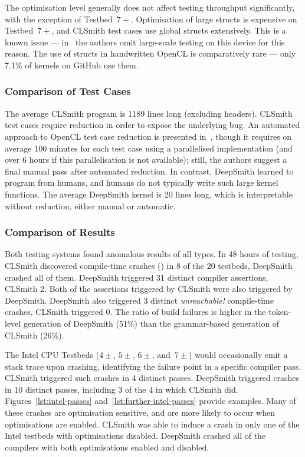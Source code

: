 The optimisation level generally does not affect testing throughput significantly, with the exception of Testbed~$7+$. Optimisation of large structs is expensive on Testbed~$7+$, and CLSmith test cases use global structs extensively. This is a known issue --- in~\cite{Lidbury2015a} the authors omit large-scale testing on this device for this reason. The use of structs in handwritten OpenCL is comparatively rare --- only 7.1\% of kernels on GitHub use them.


\subsubsection{Comparison of Test Cases}

The average CLSmith program is 1189 lines long (excluding headers). CLSmith test cases require reduction in order to expose the underlying bug. An automated approach to OpenCL test case reduction is presented in~\cite{Pflanzer2016}, though it requires on average 100 minutes for each test case using a parallelised implementation (and over 6 hours if this parallelisation is not available); still, the authors suggest a final manual pass after automated reduction. In contrast, DeepSmith learned to program from humans, and humans do not typically write such large kernel functions. The average DeepSmith kernel is 20 lines long, which is interpretable without reduction, either manual or automatic.


\subsubsection{Comparison of Results}

Both testing systems found anomalous results of all types. In 48 hours of testing, CLSmith discovered compile-time crashes (\bc) in 8 of the 20 testbeds, DeepSmith crashed all of them. DeepSmith triggered 31 distinct compiler assertions, CLSmith 2. Both of the assertions triggered by CLSmith were also triggered by DeepSmith. DeepSmith also triggered 3 distinct \emph{unreachable!} compile-time crashes, CLSmith triggered 0. The ratio of build failures is higher in the token-level generation of DeepSmith (51\%) than the grammar-based generation of CLSmith (26\%).

The Intel CPU Testbeds ($4\pm$, $5\pm$, $6\pm$, and~$7\pm$) would occasionally emit a stack trace upon crashing, identifying the failure point in a specific compiler pass. CLSmith triggered such crashes in 4 distinct passes. DeepSmith triggered crashes in 10 distinct passes, including 3 of the 4 in which CLSmith did. Figures~\ref{lst:intel-passes} and~\ref{lst:further-intel-passes} provide examples. Many of these crashes are optimisation sensitive, and are more likely to occur when optimisations are enabled. CLSmith was able to induce a crash in only one of the Intel testbeds with optimisations disabled. DeepSmith crashed all of the compilers with both optimisations enabled and disabled.

